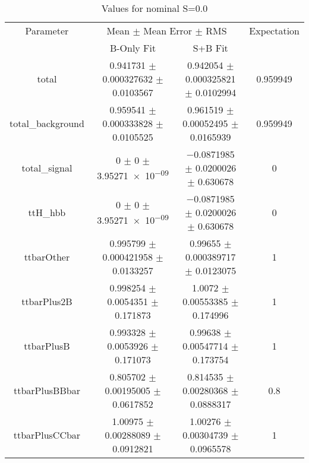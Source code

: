 \begin{table}
\centering
\caption{Values for nominal S=0.0}
\begin{tabular}{cccc}
\toprule
Parameter & \multicolumn{2}{c}{Mean $\pm$ Mean Error $\pm$ RMS} & Expectation\\
 & B-Only Fit & S+B Fit & \\
\midrule
total & \num{0.941731} $\pm$ \num{0.000327632} $\pm$ \num{0.0103567} & \num{0.942054} $\pm$ \num{0.000325821} $\pm$ \num{0.0102994} & \num{0.959949}\\
total\_background & \num{0.959541} $\pm$ \num{0.000333828} $\pm$ \num{0.0105525} & \num{0.961519} $\pm$ \num{0.00052495} $\pm$ \num{0.0165939} & \num{0.959949}\\
total\_signal & \num{0} $\pm$ \num{0} $\pm$ \num{3.95271e-09} & \num{-0.0871985} $\pm$ \num{0.0200026} $\pm$ \num{0.630678} & \num{0}\\
ttH\_hbb & \num{0} $\pm$ \num{0} $\pm$ \num{3.95271e-09} & \num{-0.0871985} $\pm$ \num{0.0200026} $\pm$ \num{0.630678} & \num{0}\\
ttbarOther & \num{0.995799} $\pm$ \num{0.000421958} $\pm$ \num{0.0133257} & \num{0.99655} $\pm$ \num{0.000389717} $\pm$ \num{0.0123075} & \num{1}\\
ttbarPlus2B & \num{0.998254} $\pm$ \num{0.0054351} $\pm$ \num{0.171873} & \num{1.0072} $\pm$ \num{0.00553385} $\pm$ \num{0.174996} & \num{1}\\
ttbarPlusB & \num{0.993328} $\pm$ \num{0.0053926} $\pm$ \num{0.171073} & \num{0.99638} $\pm$ \num{0.00547714} $\pm$ \num{0.173754} & \num{1}\\
ttbarPlusBBbar & \num{0.805702} $\pm$ \num{0.00195005} $\pm$ \num{0.0617852} & \num{0.814535} $\pm$ \num{0.00280368} $\pm$ \num{0.0888317} & \num{0.8}\\
ttbarPlusCCbar & \num{1.00975} $\pm$ \num{0.00288089} $\pm$ \num{0.0912821} & \num{1.00276} $\pm$ \num{0.00304739} $\pm$ \num{0.0965578} & \num{1}\\
\bottomrule
\end{tabular}
\end{table}